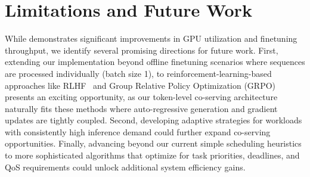 \section{Limitations and Future Work}
While \sys demonstrates significant improvements in GPU utilization and finetuning throughput, we identify several promising directions for future work. First, extending our implementation beyond offline finetuning scenarios where sequences are processed individually (batch size 1), to reinforcement-learning-based approaches like RLHF~\cite{sheng2024hybridflow, Stiennon2020} and Group Relative Policy Optimization (GRPO)~\cite{guo2025deepseek, MultiObjGRPO, DAPO} presents an exciting opportunity, as our token-level co-serving architecture naturally fits these methods where auto-regressive generation and gradient updates are tightly coupled. Second, developing adaptive strategies for workloads with consistently high inference demand could further expand co-serving opportunities. Finally, advancing beyond our current simple scheduling heuristics to more sophisticated algorithms that optimize for task priorities, deadlines, and QoS requirements could unlock additional system efficiency gains.